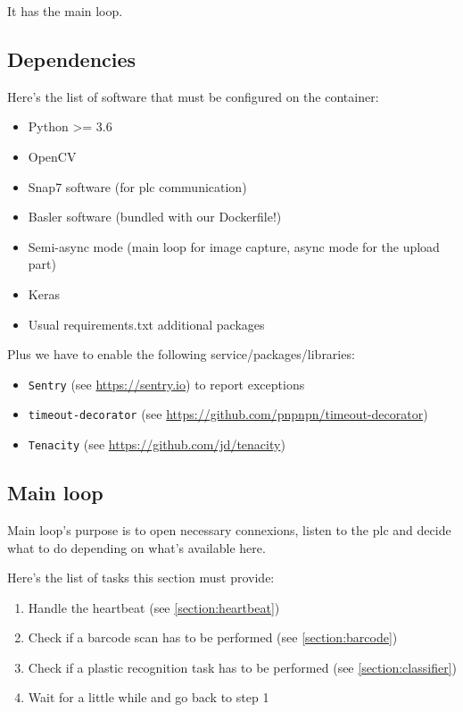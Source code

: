 It has the main loop.

\subsection{Dependencies}


Here's the list of software that must be configured on the container:

\begin{itemize}
    \item Python >= 3.6
    \item OpenCV
    \item Snap7 software (for \gls{plc} communication)
    \item Basler software (bundled with our Dockerfile!)
    \item Semi-async mode (main loop for image capture, async mode for the upload part)
    \item Keras
    \item Usual requirements.txt additional packages
\end{itemize}

Plus we have to enable the following service/packages/libraries:

\begin{itemize}
    \item \texttt{Sentry} (see \url{https://sentry.io}) to report exceptions
    \item \texttt{timeout-decorator} (see \url{https://github.com/pnpnpn/timeout-decorator})
    \item \texttt{Tenacity} (see \url{https://github.com/jd/tenacity})
\end{itemize}


\subsection{Main loop}

Main loop's purpose is to open necessary connexions, listen to the \gls{plc} and decide what to do depending on what's available here.

Here's the list of tasks this section must provide:

\begin{enumerate}
    \item Handle the \gls{heartbeat} (see \ref{section:heartbeat})
    \item Check if a barcode scan has to be performed (see \ref{section:barcode})
    \item Check if a plastic recognition task has to be performed (see \ref{section:classifier})
    \item Wait for a little while and go back to step 1
\end{enumerate}




